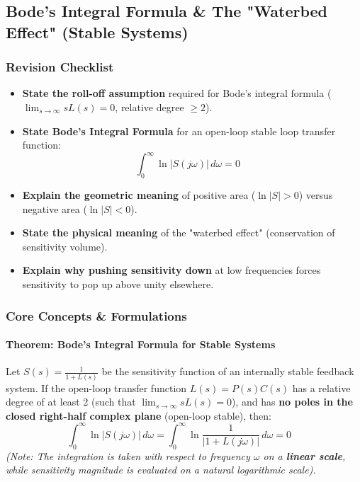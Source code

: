 \documentclass[12pt,onecolumn,twoside ]{article}
\begin{document}
	\subsection{Bode's Integral Formula \& The "Waterbed Effect" (Stable Systems)}
	\subsubsection{Revision Checklist}
	\begin{itemize}
		\item[$\square$]
		\textbf{State the roll-off assumption} required for Bode's integral formula ($\lim_{s \to \infty} s L(s) = 0$, relative degree $\ge 2$).
		\item[$\square$]
		\textbf{State Bode's Integral Formula} for an open-loop stable loop transfer function: \[
		\int_{0}^{\infty} \ln |S(j\omega)|\, d\omega = 0 \quad
		\]
		\item[$\square$]
		\textbf{Explain the geometric meaning} of positive area ($\ln |S| > 0$) versus negative area ($\ln |S| < 0$).
		\item[$\square$]
		\textbf{State the physical meaning} of the "waterbed effect" (conservation of sensitivity volume).
		\item[$\square$]
		\textbf{Explain why pushing sensitivity down} at low frequencies forces sensitivity to pop up above unity elsewhere.
	\end{itemize}
	
	\subsubsection{Core Concepts \& Formulations}
	\paragraph{Theorem: Bode's Integral Formula for Stable Systems}
	Let $S(s) = \frac{1}{1 + L(s)}$ be the sensitivity function of an internally stable feedback system. If the open-loop transfer function $L(s) = P(s)C(s)$ has a relative degree of at least 2 (such that $\lim_{s \to \infty} s L(s) = 0$), and has \textbf{no poles in the closed right-half complex plane} (open-loop stable), then:
	\[
	\int_{0}^{\infty} \ln |S(j\omega)|\, d\omega = \int_{0}^{\infty} \ln \frac{1}{|1 + L(j\omega)|}\, d\omega = 0 \quad
	\]
	\textit{(Note: The integration is taken with respect to frequency $\omega$ on a \textbf{linear scale}, while sensitivity magnitude is evaluated on a natural logarithmic scale).}
\end{document}
